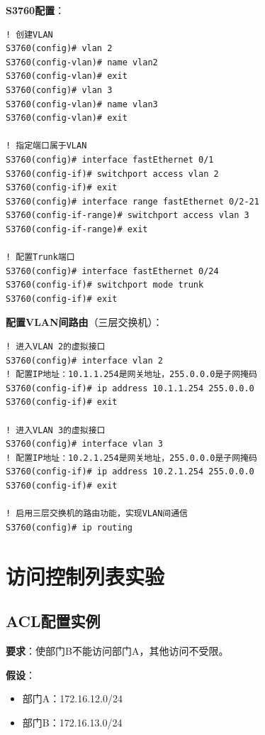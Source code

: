 \documentclass[12pt,a4paper]{ctexart}
\begin{document}
\begin{cmdbox}
\textbf{S3760配置}：
\begin{lstlisting}
! 创建VLAN
S3760(config)# vlan 2
S3760(config-vlan)# name vlan2
S3760(config-vlan)# exit
S3760(config)# vlan 3
S3760(config-vlan)# name vlan3
S3760(config-vlan)# exit

! 指定端口属于VLAN
S3760(config)# interface fastEthernet 0/1
S3760(config-if)# switchport access vlan 2
S3760(config-if)# exit
S3760(config)# interface range fastEthernet 0/2-21
S3760(config-if-range)# switchport access vlan 3
S3760(config-if-range)# exit

! 配置Trunk端口
S3760(config)# interface fastEthernet 0/24
S3760(config-if)# switchport mode trunk
S3760(config-if)# exit
\end{lstlisting}

\textbf{配置VLAN间路由}（三层交换机）：
\begin{lstlisting}
! 进入VLAN 2的虚拟接口
S3760(config)# interface vlan 2
! 配置IP地址：10.1.1.254是网关地址，255.0.0.0是子网掩码
S3760(config-if)# ip address 10.1.1.254 255.0.0.0
S3760(config-if)# exit

! 进入VLAN 3的虚拟接口
S3760(config)# interface vlan 3
! 配置IP地址：10.2.1.254是网关地址，255.0.0.0是子网掩码
S3760(config-if)# ip address 10.2.1.254 255.0.0.0
S3760(config-if)# exit

! 启用三层交换机的路由功能，实现VLAN间通信
S3760(config)# ip routing
\end{lstlisting}
\end{cmdbox}

\section{访问控制列表实验}

\subsection{ACL配置实例}

\begin{exambox}[ACL实验题]
\textbf{要求}：使部门B不能访问部门A，其他访问不受限。

\textbf{假设}：
\begin{itemize}[itemsep=0pt]
    \item 部门A：172.16.12.0/24
    \item 部门B：172.16.13.0/24
\end{itemize}
\end{exambox}
\end{document}
